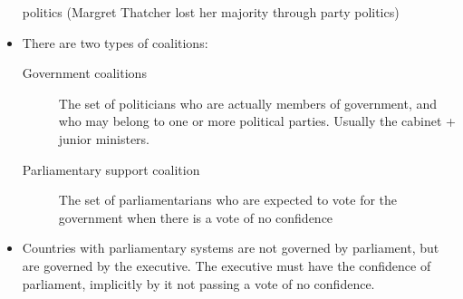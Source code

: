 \documentclass[11pt]{article}
\begin{document}
\begin{itemize}
politics (Margret Thatcher lost her majority through party politics)
\item There are two types of coalitions:
\begin{description}
\item[{Government coalitions}] The set of politicians who are actually members of
government, and who may belong to one or more political parties. Usually the
cabinet + junior ministers.
\item[{Parliamentary support coalition}] The set of parliamentarians who are
expected to vote for the government when there is a vote of no confidence
\end{description}
\item Countries with parliamentary systems are not governed by parliament, but
  are governed by the executive. The executive must have the confidence of
  parliament, implicitly by it not passing a vote of no confidence.
\end{itemize}
\end{document}
